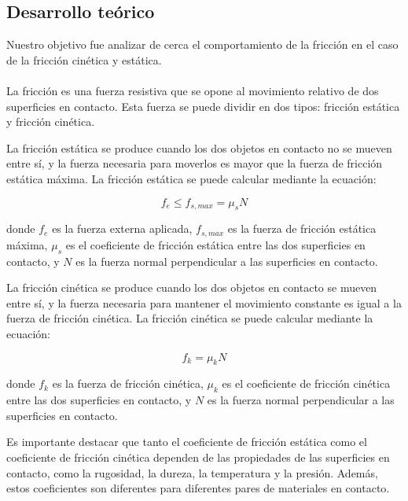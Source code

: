 \documentclass{article}
\begin{document}

\begin{multicols}{2}

\section{Desarrollo teórico}\label{Desarrollo Teorico}                              	%
Nuestro objetivo fue analizar de cerca el comportamiento de la fricción en el caso de la fricción cinética y estática.
\\
\\
La fricción es una fuerza resistiva que se opone al movimiento relativo de dos superficies en contacto. Esta fuerza se puede dividir en dos tipos: fricción estática y fricción cinética.

La fricción estática se produce cuando los dos objetos en contacto no se mueven entre sí, y la fuerza necesaria para moverlos es mayor que la fuerza de fricción estática máxima. La fricción estática se puede calcular mediante la ecuación:

\begin{equation}
f_{e} \leq f_{s,max} = \mu_s N
\end{equation}

donde $f_{e}$ es la fuerza externa aplicada, $f_{s,max}$ es la fuerza de fricción estática máxima, $\mu_s$ es el coeficiente de fricción estática entre las dos superficies en contacto, y $N$ es la fuerza normal perpendicular a las superficies en contacto.

La fricción cinética se produce cuando los dos objetos en contacto se mueven entre sí, y la fuerza necesaria para mantener el movimiento constante es igual a la fuerza de fricción cinética. La fricción cinética se puede calcular mediante la ecuación:

\begin{equation}
f_{k} = \mu_k N
\end{equation}

donde $f_{k}$ es la fuerza de fricción cinética, $\mu_k$ es el coeficiente de fricción cinética entre las dos superficies en contacto, y $N$ es la fuerza normal perpendicular a las superficies en contacto.

Es importante destacar que tanto el coeficiente de fricción estática como el coeficiente de fricción cinética dependen de las propiedades de las superficies en contacto, como la rugosidad, la dureza, la temperatura y la presión. Además, estos coeficientes son diferentes para diferentes pares de materiales en contacto.


\end{multicols}
\end{document}
